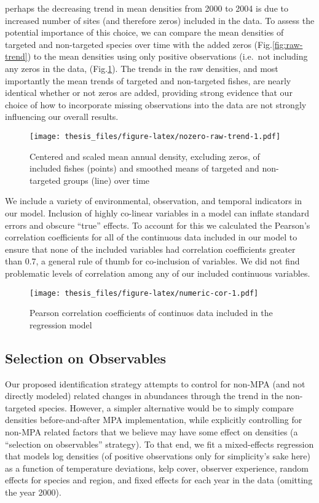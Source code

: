 \documentclass[twoside,12pt,final]{ucthesis-CA2012}
\begin{document}
\begin{ucmainmatter}
perhaps the decreasing trend in mean densities from 2000 to 2004 is due
to increased number of sites (and therefore zeros) included in the data.
To assess the potential importance of this choice, we can compare the
mean densities of targeted and non-targeted species over time with the
added zeros (Fig.\ref{fig:raw-trend}) to the mean densities using only
positive observations (i.e.~not including any zeros in the data,
(Fig.\ref{fig:nozero-raw-trend}). The trends in the raw densities, and
most importantly the mean trends of targeted and non-targeted fishes,
are nearly identical whether or not zeros are added, providing strong
evidence that our choice of how to incorporate missing observations into
the data are not strongly influencing our overall results.
\begin{figure}
\centering
\texttt{[image: thesis\_files/figure-latex/nozero-raw-trend-1.pdf]}
\caption{\label{fig:nozero-raw-trend}Centered and scaled mean annual
density, excluding zeros, of included fishes (points) and smoothed means
of targeted and non-targeted groups (line) over time}
\end{figure}
We include a variety of environmental, observation, and temporal
indicators in our model. Inclusion of highly co-linear variables in a
model can inflate standard errors and obscure ``true'' effects. To
account for this we calculated the Pearson's correlation coefficients
for all of the continuous data included in our model to ensure that none
of the included variables had correlation coefficients greater than 0.7,
a general rule of thumb for co-inclusion of variables. We did not find
problematic levels of correlation among any of our included continuous
variables.
\begin{figure}
\centering
\texttt{[image: thesis\_files/figure-latex/numeric-cor-1.pdf]}
\caption{\label{fig:numeric-cor}Pearson correlation coefficients of
continuos data included in the regression model}
\end{figure}
\subsection{Selection on Observables}\label{selection-on-observables}

Our proposed identification strategy attempts to control for non-MPA
(and not directly modeled) related changes in abundances through the
trend in the non-targeted species. However, a simpler alternative would
be to simply compare densities before-and-after MPA implementation,
while explicitly controlling for non-MPA related factors that we believe
may have some effect on densities (a ``selection on observables''
strategy). To that end, we fit a mixed-effects regression that models
log densities (of positive observations only for simplicity's sake here)
as a function of temperature deviations, kelp cover, observer
experience, random effects for species and region, and fixed effects for
each year in the data (omitting the year 2000).


\end{ucmainmatter}
\end{document}
